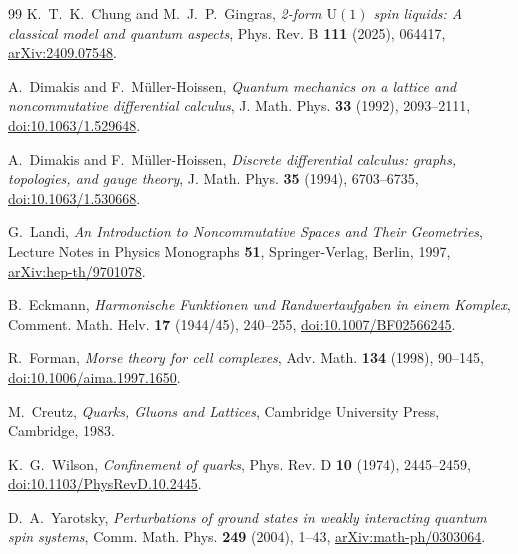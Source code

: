 \documentclass[11pt,a4paper]{article}
\theoremstyle{definition}
\newcommand{\U}{\mathrm{U}}
\begin{document}
\begin{thebibliography}{99}
K.~T.~K.~Chung and M.~J.~P.~Gingras,
\emph{2-form $\U(1)$ spin liquids: A classical model and quantum aspects},
Phys. Rev. B \textbf{111} (2025), 064417,
\href{https://arxiv.org/abs/2409.07548}{arXiv:2409.07548}.

A.~Dimakis and F.~M\"uller-Hoissen,
\emph{Quantum mechanics on a lattice and noncommutative differential calculus},
J. Math. Phys. \textbf{33} (1992), 2093--2111,
\href{https://doi.org/10.1063/1.529648}{doi:10.1063/1.529648}.

A.~Dimakis and F.~M\"uller-Hoissen,
\emph{Discrete differential calculus: graphs, topologies, and gauge theory},
J. Math. Phys. \textbf{35} (1994), 6703--6735,
\href{https://doi.org/10.1063/1.530668}{doi:10.1063/1.530668}.

G.~Landi,
\emph{An Introduction to Noncommutative Spaces and Their Geometries},
Lecture Notes in Physics Monographs \textbf{51}, Springer-Verlag, Berlin, 1997,
\href{https://arxiv.org/abs/hep-th/9701078}{arXiv:hep-th/9701078}.

B.~Eckmann,
\emph{Harmonische Funktionen und Randwertaufgaben in einem Komplex},
Comment. Math. Helv. \textbf{17} (1944/45), 240--255,
\href{https://doi.org/10.1007/BF02566245}{doi:10.1007/BF02566245}.

R.~Forman,
\emph{Morse theory for cell complexes},
Adv. Math. \textbf{134} (1998), 90--145,
\href{https://doi.org/10.1006/aima.1997.1650}{doi:10.1006/aima.1997.1650}.

M.~Creutz,
\emph{Quarks, Gluons and Lattices},
Cambridge University Press, Cambridge, 1983.

K.~G.~Wilson,
\emph{Confinement of quarks},
Phys. Rev. D \textbf{10} (1974), 2445--2459,
\href{https://doi.org/10.1103/PhysRevD.10.2445}{doi:10.1103/PhysRevD.10.2445}.

D.~A.~Yarotsky,
\emph{Perturbations of ground states in weakly interacting quantum spin systems},
Comm. Math. Phys. \textbf{249} (2004), 1--43,
\href{https://arxiv.org/abs/math-ph/0303064}{arXiv:math-ph/0303064}.

\end{thebibliography}
\end{document}
